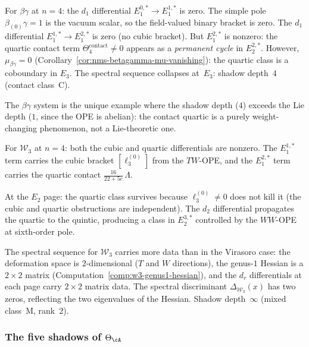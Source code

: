 \begin{computation}
\label{comp:holographic-ss-betagamma}
For $\beta\gamma$ at $n=4$: the $d_1$ differential
$E_1^{0,*}\to E_1^{1,*}$ is zero. The simple pole
$\beta_{(0)}\gamma=1$ is the vacuum scalar, so the
field-valued binary bracket is zero. The $d_1$ differential
$E_1^{1,*}\to E_1^{2,*}$ is zero (no cubic bracket).
But $E_1^{2,*}$ is nonzero: the quartic contact term
$\Theta_4^{\mathrm{contact}}\neq 0$ appears as a
\emph{permanent cycle} in $E_2^{2,*}$. However,
$\mu_{\beta\gamma}=0$
(Corollary~\ref{cor:nms-betagamma-mu-vanishing}): the
quartic class is a coboundary in $E_3$.
The spectral sequence collapses at~$E_3$: shadow depth~$4$
(contact class~C).

The $\beta\gamma$ system is the unique example where
the shadow depth ($4$) exceeds the Lie depth ($1$, since the
OPE is abelian): the contact quartic is a purely
weight-changing phenomenon, not a Lie-theoretic one.
\end{computation}

\begin{computation}
\label{comp:holographic-ss-w3}
For $\mathcal W_3$ at $n=4$: both the cubic and quartic
differentials are nonzero. The $E_1^{1,*}$ term carries the
cubic bracket $[\ell_3^{(0)}]$ from the $TW$-OPE, and the
$E_1^{2,*}$ term carries the quartic contact
$\frac{16}{22+5c}\,\Lambda$.

At the $E_2$ page: the quartic class survives because
$\ell_3^{(0)}\neq 0$ does not kill it (the cubic and quartic
obstructions are independent). The $d_2$ differential
propagates the quartic to the quintic, producing a class in
$E_2^{3,*}$ controlled by the $WW$-OPE at sixth-order pole.

The spectral sequence for $\mathcal W_3$ carries more data
than in the Virasoro case: the deformation space is $2$-dimensional
($T$ and $W$ directions), the genus-$1$ Hessian is a
$2\times 2$ matrix
(Computation~\ref{comp:w3-genus1-hessian}),
and the $d_r$ differentials at each page carry $2\times 2$
matrix data. The spectral discriminant
$\Delta_{\mathcal W_3}(x)$ has two zeros, reflecting the
two eigenvalues of the Hessian.
Shadow depth~$\infty$ (mixed class~M, rank~$2$).
\end{computation}

\subsubsection{The five shadows of $\Theta_\cA$}

